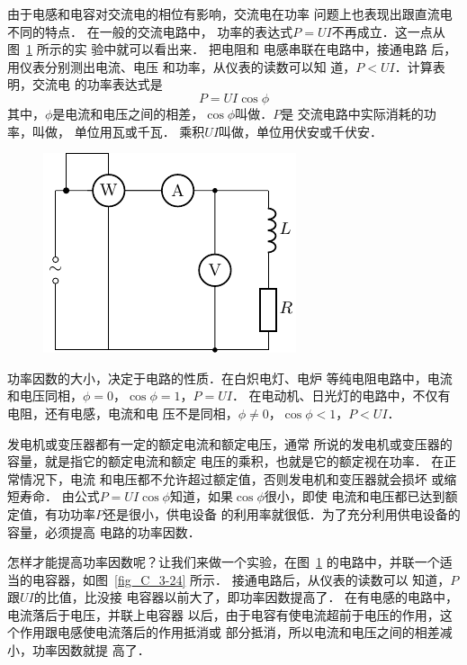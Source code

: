 由于电感和电容对交流电的相位有影响，交流电在功率
问题上也表现出跟直流电不同的特点．
在一般的交流电路中，
功率的表达式$P=UI$不再成立．这一点从图~\ref{fig_C_3-23} 所示的实
验中就可以看出来．
把电阻和
电感串联在电路中，接通电路
后，用仪表分别测出电流、电压
和功率，从仪表的读数可以知
道，$P<UI$．计算表明，交流电
的功率表达式是
\[P=UI\cos\phi\]
其中，$\phi$是电流和电压之间的相差，$\cos\phi$叫做．$P$是
交流电路中实际消耗的功率，叫做，
单位用瓦或千瓦．
乘积$UI$叫做，单位用伏安或千伏安．

\begin{figure}[htbp]
	\centering
	\includegraphics{fig/C/3-23.pdf}
	\caption{}\label{fig_C_3-23}
\end{figure}


功率因数的大小，决定于电路的性质．在白炽电灯、电炉
等纯电阻电路中，电流和电压同相，$\phi=0$，$\cos\phi=1$，$P=UI$．
在电动机、日光灯的电路中，不仅有电阻，还有电感，电流和电
压不是同相，$\phi\ne 0$，$\cos\phi<1$，$P<UI$．

发电机或变压器都有一定的额定电流和额定电压，通常
所说的发电机或变压器的容量，就是指它的额定电流和额定
电压的乘积，也就是它的额定视在功率．
在正常情况下，电流
和电压都不允许超过额定值，否则发电机和变压器就会损坏
或缩短寿命．
由公式$P=UI\cos\phi$知道，如果$\cos\phi$很小，即使
电流和电压都已达到额定值，有功功率$P$还是很小，供电设备
的利用率就很低．为了充分利用供电设备的容量，必须提高
电路的功率因数．



怎样才能提高功率因数呢？让我们来做一个实验，在图~\ref{fig_C_3-23} 的电路中，并联一个适当的电容器，如图~\ref{fig_C_3-24} 所示．
接通电路后，从仪表的读数可以
知道，$P$跟$UI$的比值，比没接
电容器以前大了，即功率因数提高了．
在有电感的电路中，电流落后于电压，并联上电容器
以后，由于电容有使电流超前于电压的作用，这个作用跟电感使电流落后的作用抵消或
部分抵消，所以电流和电压之间的相差减小，功率因数就提
高了．


